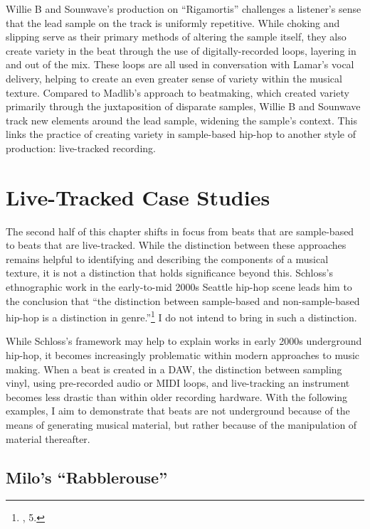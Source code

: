 Willie B and Sounwave's production on ``Rigamortis'' challenges a listener's sense that 
the lead sample on the track is uniformly repetitive. While choking and slipping serve as
their primary methods of altering the sample itself, they also create variety in the beat
through the use of digitally-recorded loops, layering in and out of the mix. These loops
are all used in conversation with Lamar's vocal delivery, helping to create an even greater
sense of variety within the musical texture. Compared to Madlib's approach to beatmaking, 
which created variety primarily through the juxtaposition of disparate samples, Willie B 
and Sounwave track new elements around the lead sample, widening the sample's context. This
links the practice of creating variety in sample-based hip-hop to another style of 
production: live-tracked recording.

\section{Live-Tracked Case Studies}
The second half of this chapter shifts in focus from beats that are sample-based to beats that are
live-tracked. While the distinction between these approaches remains helpful to identifying and describing
the components of a musical texture, it is not a distinction that holds significance beyond this. 
Schloss's ethnographic work in the early-to-mid 2000s Seattle hip-hop scene leads him to the conclusion
that ``the distinction between sample-based and non-sample-based hip-hop is a distinction in
genre.''\footnote{\cite{josephgschlossMakingBeatsArt2004}, 5.} I do not intend to bring in 
such a distinction.

While Schloss's framework may help to explain works in early 2000s underground hip-hop, it becomes
increasingly problematic within modern approaches to music making. When a beat is created in a DAW, 
the distinction between sampling vinyl, using pre-recorded audio or MIDI loops, and live-tracking an
instrument becomes less drastic than within older recording hardware. With the following examples, I aim
to demonstrate that beats are not underground because of the means of generating musical material, but 
rather because of the manipulation of material thereafter.

\subsection*{\centering Milo's ``Rabblerouse''}

